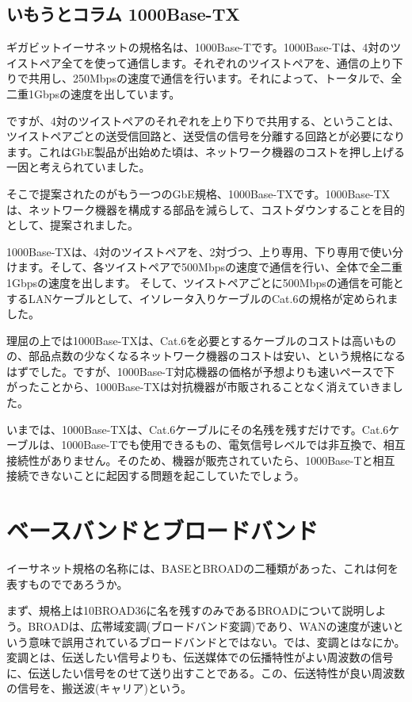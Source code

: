 \subsection*{いもうとコラム 1000Base-TX}
ギガビットイーサネットの規格名は、1000Base-Tです。1000Base-Tは、4対のツイストペア全てを使って通信します。それぞれのツイストペアを、通信の上り下りで共用し、250Mbpsの速度で通信を行います。それによって、トータルで、全二重1Gbpsの速度を出しています。

ですが、4対のツイストペアのそれぞれを上り下りで共用する、ということは、ツイストペアごとの送受信回路と、送受信の信号を分離する回路とが必要になります。これはGbE製品が出始めた頃は、ネットワーク機器のコストを押し上げる一因と考えられていました。

そこで提案されたのがもう一つのGbE規格、1000Base-TXです。1000Base-TXは、ネットワーク機器を構成する部品を減らして、コストダウンすることを目的として、提案されました。

1000Base-TXは、4対のツイストペアを、2対づつ、上り専用、下り専用で使い分けます。そして、各ツイストペアで500Mbpsの速度で通信を行い、全体で全二重1Gbpsの速度を出します。
そして、ツイストペアごとに500Mbpsの通信を可能とするLANケーブルとして、イソレータ入りケーブルのCat.6の規格が定められました。

理屈の上では1000Base-TXは、Cat.6を必要とするケーブルのコストは高いものの、部品点数の少なくなるネットワーク機器のコストは安い、という規格になるはずでした。ですが、1000Base-T対応機器の価格が予想よりも速いペースで下がったことから、1000Base-TXは対抗機器が市販されることなく消えていきました。

いまでは、1000Base-TXは、Cat.6ケーブルにその名残を残すだけです。Cat.6ケーブルは、1000Base-Tでも使用できるもの、電気信号レベルでは非互換で、相互接続性がありません。そのため、機器が販売されていたら、1000Base-Tと相互接続できないことに起因する問題を起こしていたでしょう。



\section{ベースバンドとブロードバンド}

イーサネット規格の名称には、BASEとBROADの二種類があった、これは何を表すものでであろうか。

まず、規格上は10BROAD36に名を残すのみであるBROADについて説明しよう。BROADは、広帯域変調(ブロードバンド変調)であり、WANの速度が速いという意味で誤用されているブロードバンドとではない。では、変調とはなにか。変調とは、伝送したい信号よりも、伝送媒体での伝播特性がよい周波数の信号に、伝送したい信号をのせて送り出すことである。この、伝送特性が良い周波数の信号を、搬送波(キャリア)という。

